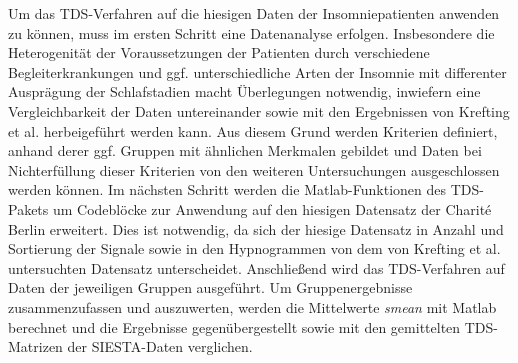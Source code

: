 Um das \acs{TDS}-Verfahren auf die hiesigen Daten der Insomniepatienten anwenden zu können, muss im ersten Schritt eine Datenanalyse erfolgen. Insbesondere die Heterogenität der Voraussetzungen der Patienten durch verschiedene Begleiterkrankungen und ggf. unterschiedliche Arten der Insomnie mit differenter Ausprägung der Schlafstadien macht Überlegungen notwendig, inwiefern eine Vergleichbarkeit der Daten untereinander sowie mit den Ergebnissen von Krefting et al. \parencite{krefting_age_2017} herbeigeführt werden kann. Aus diesem Grund werden Kriterien definiert, anhand derer ggf. Gruppen mit ähnlichen Merkmalen gebildet und Daten bei Nichterfüllung dieser Kriterien von den weiteren Untersuchungen ausgeschlossen werden können. Im nächsten Schritt werden die Matlab-Funktionen des \acs{TDS}-Pakets um Codeblöcke zur Anwendung auf den hiesigen Datensatz der Charit\'{e} Berlin erweitert. Dies ist notwendig, da sich der hiesige Datensatz in Anzahl und Sortierung der Signale sowie in den Hypnogrammen von dem von Krefting et al. untersuchten Datensatz unterscheidet. Anschließend wird das \acs{TDS}-Verfahren auf Daten der jeweiligen Gruppen ausgeführt. Um Gruppenergebnisse zusammenzufassen und auszuwerten, werden die Mittelwerte \textit{smean} mit Matlab berechnet und die Ergebnisse gegenübergestellt sowie mit den gemittelten \acs{TDS}-Matrizen der SIESTA-Daten verglichen.\\

